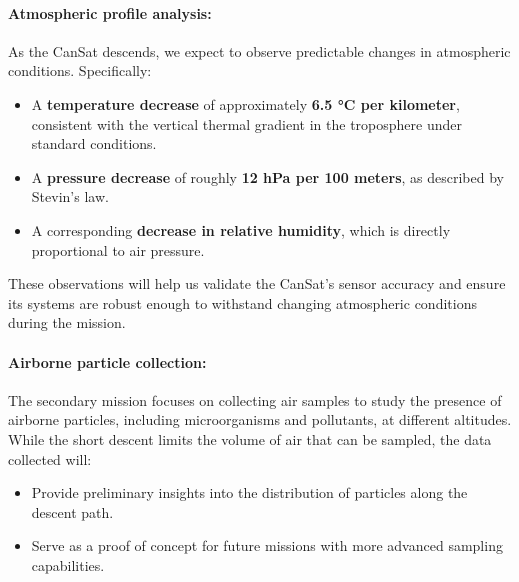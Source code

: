 \paragraph*{Atmospheric profile analysis:}
As the CanSat descends, we expect to observe predictable changes in atmospheric conditions. Specifically:
\begin{itemize}[leftmargin=1.27cm, itemindent=0cm, topsep=2pt]
    \item A \textbf{temperature decrease} of approximately \textbf{6.5 °C per kilometer}, consistent with the vertical thermal gradient in the troposphere under standard conditions.
    \item A \textbf{pressure decrease} of roughly \textbf{12 hPa per 100 meters}, as described by Stevin’s law.
    \item A corresponding \textbf{decrease in relative humidity}, which is directly proportional to air pressure.
\end{itemize}

These observations will help us validate the CanSat’s sensor accuracy and ensure its systems are robust enough to withstand changing atmospheric conditions during the mission.

\paragraph*{Airborne particle collection:}
The secondary mission focuses on collecting air samples to study the presence of airborne particles, including microorganisms and pollutants, at different altitudes. While the short descent limits the volume of air that can be sampled, the data collected will:
\begin{itemize}[leftmargin=1.27cm, itemindent=0cm, topsep=2pt]
    \item Provide preliminary insights into the distribution of particles along the descent path.
    \item Serve as a proof of concept for future missions with more advanced sampling capabilities.
\end{itemize}

